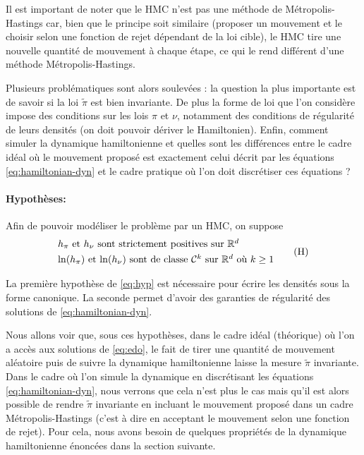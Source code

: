 \documentclass[10pt,a4paper]{article}
\begin{document}
Il est important de noter que le HMC n'est pas une méthode de Métropolis-Hastings car, bien que le principe soit similaire (proposer un mouvement et le choisir selon une fonction de rejet dépendant de la loi cible), le HMC tire une nouvelle quantité de mouvement à chaque étape, ce qui le rend différent d'une méthode Métropolis-Hastings.

Plusieurs problématiques sont alors soulevées : la question la plus importante est de savoir si la loi $\widetilde{\pi}$ est bien invariante. De plus la forme de loi que l'on considère impose des conditions sur les lois $\pi$ et $\nu$, notamment des conditions de régularité de leurs densités (on doit pouvoir dériver le Hamiltonien). Enfin, comment simuler la dynamique hamiltonienne et quelles sont les différences entre le cadre idéal où le mouvement proposé est exactement celui décrit par les équations \eqref{eq:hamiltonian-dyn} et le cadre pratique où l'on doit discrétiser ces équations ?

\paragraph{Hypothèses:}
Afin de pouvoir modéliser le problème par un HMC, on suppose
\begin{equation}\label{eq:hyp}
  \begin{aligned}
    &\mbox{$h_\pi$ et $h_\nu$ sont strictement positives sur $\mathbb{R}^d$} \\
    &\mbox{$\ln(h_\pi)$ et $\ln(h_\nu)$ sont de classe $\mathcal{C}^k$ sur $\mathbb{R}^d$ où $k \geq 1$}
  \end{aligned}
  \tag{H}
\end{equation}

\begin{Rque}
  La première hypothèse de \eqref{eq:hyp} est nécessaire pour écrire les densités sous la forme canonique. La seconde permet d'avoir des garanties de régularité des solutions de \eqref{eq:hamiltonian-dyn}. 
\end{Rque}

Nous allons voir que, sous ces hypothèses, dans le cadre idéal (théorique) où l'on a accès aux solutions de \eqref{eq:edo}, le fait de tirer une quantité de mouvement aléatoire puis de suivre la dynamique hamiltonienne laisse la mesure $\tilde{\pi}$ invariante. Dans le cadre où l'on simule la dynamique en discrétisant les équations \eqref{eq:hamiltonian-dyn}, nous verrons que cela n'est plus le cas mais qu'il est alors possible de rendre $\tilde{\pi}$ invariante en incluant le mouvement proposé dans un cadre Métropolis-Hastings (c'est à dire en acceptant le mouvement selon une fonction de rejet). Pour cela, nous avons besoin de quelques propriétés de la dynamique hamiltonienne énoncées dans la section suivante.
\end{document}
